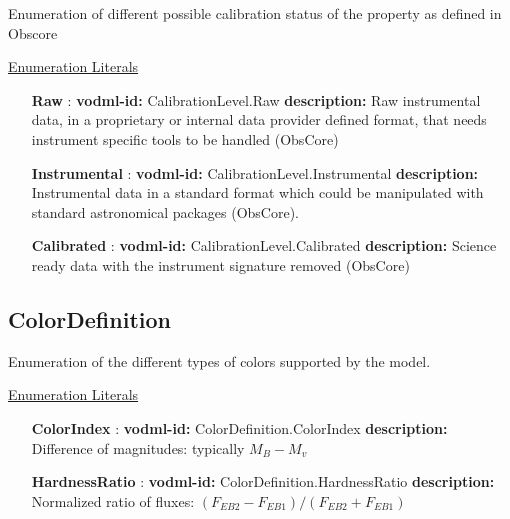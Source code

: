   Enumeration of different possible calibration status of the property as defined in Obscore

  \noindent \underline{Enumeration Literals}
  \vspace{-\parsep}
  \small
  \begin{itemize}
  
    \item[\textbf{Raw}]: \textbf{vodml-id:} CalibrationLevel.Raw \newline
          \textbf{description:} Raw instrumental data, in a proprietary or internal data provider defined format, that needs instrument specific tools to be handled (ObsCore)
    \item[\textbf{Instrumental}]: \textbf{vodml-id:} CalibrationLevel.Instrumental \newline
          \textbf{description:} Instrumental data in a standard format which could be manipulated with standard astronomical packages (ObsCore).
    \item[\textbf{Calibrated}]: \textbf{vodml-id:} CalibrationLevel.Calibrated \newline
          \textbf{description:} Science ready data with the instrument signature removed (ObsCore)
  \end{itemize}
  \normalsize


  \subsection{ColorDefinition}
  \label{sect:ColorDefinition}

  Enumeration of the different types of colors supported by the model.

  \noindent \underline{Enumeration Literals}
  \vspace{-\parsep}
  \small
  \begin{itemize}
  
    \item[\textbf{ColorIndex}]: \textbf{vodml-id:} ColorDefinition.ColorIndex \newline
          \textbf{description:} Difference of magnitudes: typically $M_B - M_v$
    \item[\textbf{HardnessRatio}]: \textbf{vodml-id:} ColorDefinition.HardnessRatio \newline
          \textbf{description:} Normalized ratio of fluxes: $(F_{EB2} - F_{EB1}) / (F_{EB2} + F_{EB1})$
  \end{itemize}
  \normalsize


